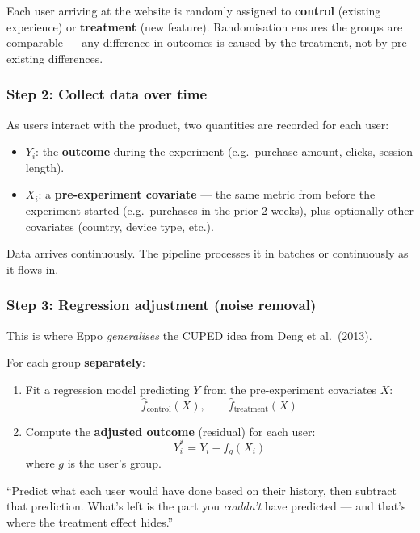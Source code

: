 \documentclass[12pt, a4paper]{article}
\begin{document}
Each user arriving at the website is randomly assigned to \textbf{control}
(existing experience) or \textbf{treatment} (new feature).  Randomisation
ensures the groups are comparable --- any difference in outcomes is caused by
the treatment, not by pre-existing differences.

\subsubsection*{Step 2: Collect data over time}

As users interact with the product, two quantities are recorded for each user:
\begin{itemize}[nosep]
  \item $Y_i$: the \textbf{outcome} during the experiment (e.g.\ purchase
        amount, clicks, session length).
  \item $X_i$: a \textbf{pre-experiment covariate} --- the same metric from
        before the experiment started (e.g.\ purchases in the prior 2 weeks),
        plus optionally other covariates (country, device type, etc.).
\end{itemize}

Data arrives continuously.  The pipeline processes it in batches or
continuously as it flows in.

\subsubsection*{Step 3: Regression adjustment (noise removal)}

This is where Eppo \emph{generalises} the CUPED idea from Deng et al.\ (2013).

For each group \textbf{separately}:
\begin{enumerate}[nosep]
  \item Fit a regression model predicting $Y$ from the pre-experiment
        covariates $X$:
        \[
          \hat{f}_{\text{control}}(X), \qquad \hat{f}_{\text{treatment}}(X)
        \]
  \item Compute the \textbf{adjusted outcome} (residual) for each user:
        \[
          Y^*_i = Y_i - \hat{f}_g(X_i)
        \]
        where $g$ is the user's group.
\end{enumerate}

\begin{plainlanguage}
``Predict what each user would have done based on their history, then subtract
that prediction.  What's left is the part you \emph{couldn't} have predicted
--- and that's where the treatment effect hides.''
\end{plainlanguage}
\end{document}
